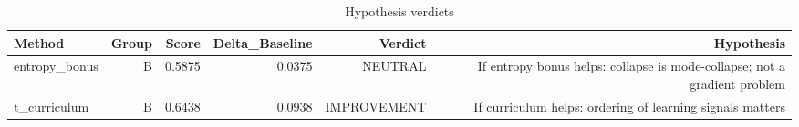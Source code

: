 \begin{table}[htbp]
\centering
\caption{Hypothesis verdicts}
\label{tab:hyp-verdicts}
\begin{tabular}{lrrrrr}
\toprule
\textbf{Method} & \textbf{Group} & \textbf{Score} & \textbf{Delta\_Baseline} & \textbf{Verdict} & \textbf{Hypothesis} \\
\midrule
entropy\_bonus & B & 0.5875 & 0.0375 & NEUTRAL & If entropy bonus helps: collapse is mode-collapse; not a gradient problem \\
t\_curriculum & B & 0.6438 & 0.0938 & IMPROVEMENT & If curriculum helps: ordering of learning signals matters \\
\bottomrule
\end{tabular}
\end{table}